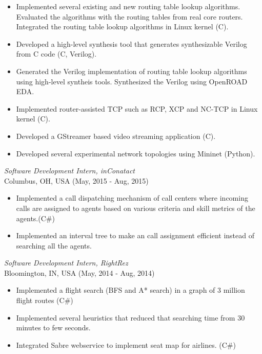\documentclass{res}
\begin{document}
\begin{resume}
   \begin{itemize} \itemsep -2pt %
  \item Implemented several existing and new routing table lookup algorithms. Evaluated the algorithms with the routing tables from real core routers. Integrated the routing table lookup algorithms in Linux kernel (C).
  \item Developed a high-level synthesis tool that generates synthesizable Verilog from C code (C, Verilog).
  \item Generated the Verilog implementation of routing table lookup algorithms using high-level syntheis tools. Synthesized the Verilog using OpenROAD EDA.
  \item Implemented router-assisted TCP such as RCP, XCP and NC-TCP in Linux kernel (C).  
  \item Developed a GStreamer based video streaming application (C).
  \item Developed several experimental network topologies using Mininet (Python).	
 \end{itemize}

{\sl Software Development Intern, inConatact} \\
Columbus, OH, USA (May, 2015 - Aug, 2015)
 \begin{itemize} \itemsep -2pt
	\item Implemented a call dispatching mechanism of call centers where incoming calls are assigned to agents based on various criteria and skill metrics of the agents.(C\#)
	\item  Implemented an interval tree to make an call assignment efficient instead of searching all the agents.
  \end{itemize} \vspace{-6pt}

{\sl Software Development Intern, RightRez} \\
Bloomington, IN, USA (May, 2014 - Aug, 2014)
\begin{itemize} \itemsep -2pt
	\item  Implemented a flight search (BFS and A* search) in a graph of 3 million flight routes (C\#)
	\item  Implemented several heuristics that reduced that searching time from 30 minutes to few seconds.
    \item  Integrated Sabre webservice to implement seat map for airlines. (C\#)
\end{itemize} \vspace{-6pt}


\end{resume}
\end{document}
